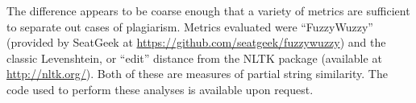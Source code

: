 The difference appears to be coarse enough that a variety of metrics are
sufficient to separate out cases of plagiarism. Metrics evaluated were
“FuzzyWuzzy” (provided by SeatGeek at
\url{https://github.com/seatgeek/fuzzywuzzy}) and the classic Levenshtein, or
“edit” distance from the NLTK package (available at \url{http://nltk.org/}). Both
of these are measures of partial string similarity. The code used to perform
these analyses is available upon request.
